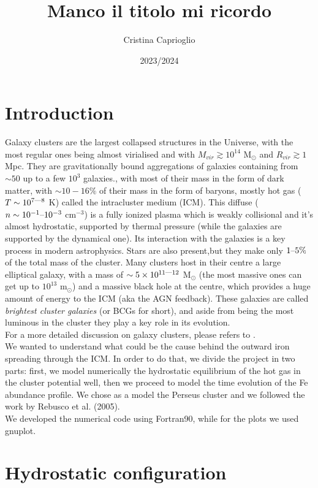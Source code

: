 \documentclass{article}
\title{Manco il titolo mi ricordo}
\author{Cristina Caprioglio}
\date{2023/2024 }
\begin{document}
\maketitle

\section*{Introduction}
Galaxy clusters are the largest collapsed structures in the Universe, with the most regular ones being almost virialised and with $M_{vir}\gtrsim 10^{14}$ M$_{\odot}$ and $R_{vir}\gtrsim 1$ Mpc. They are gravitationally bound aggregations of galaxies containing from $\sim 50$ up to a few $10^{3}$ galaxies., with most of their mass in the form of dark matter, with $\sim 10-16\%$ of their mass in the form of baryons, mostly hot gas ($T\sim 10^{7\text{\textemdash}8}$ K) called the intracluster medium (ICM). This diffuse ($n\sim 10^{-1}\text{\textendash}10^{-3}$ cm$^{-3}$) is a fully ionized plasma which is weakly collisional and it's almost hydrostatic, supported by thermal pressure (while the galaxies are supported by the dynamical one). 
Its interaction with the galaxies is a key process in modern astrophysics.
Stars are also present,but they make only $1\text{\textendash}5\%$ of the total mass of the cluster. Many clusters host in their centre a large elliptical galaxy, with a mass of $\sim 5\times 10^{11\text{\textemdash}12}$ M$_{\odot}$ (the most massive ones can get up to $10^{13}$ m$_{\odot}$) and a massive black hole at the centre, which provides a huge amount of energy to the ICM (aka the AGN feedback). These galaxies are called \textit{brightest cluster galaxies} (or BCGs for short), and aside from being the most luminous in the cluster they play a key role in its evolution.
\\For a more detailed discussion on galaxy clusters, please refers to \cite[Sec. 6.4]{cimatti}.\\
We wanted to understand what could be the cause behind the outward iron spreading through the ICM. In order to do that, we divide the project in two parts: first, we model numerically the hydrostatic equilibrium of the hot gas in the cluster potential well, then we proceed to model the time evolution of the Fe abundance profile. We chose as a model the Perseus cluster and we followed the work by Rebusco et al. (2005)\cite{rebusco}.\\
We developed the numerical code using Fortran90, while for the plots we used gnuplot. 
\section{Hydrostatic configuration}
\end{document}
